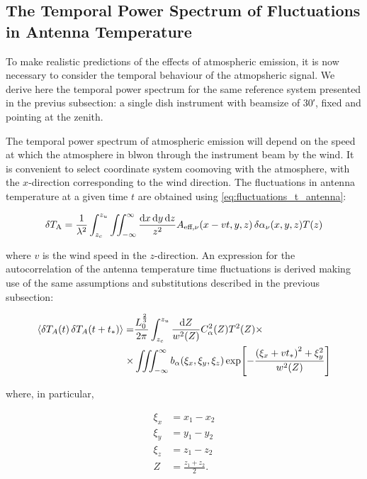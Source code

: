 \subsection{The Temporal Power Spectrum of Fluctuations in Antenna
Temperature}

To make realistic predictions of the effects of atmospheric emission, it is
now necessary to consider the temporal behaviour of the atmopsheric signal.
We derive here the temporal power spectrum for the same reference system
presented in the previus subsection: a single dish instrument with beamsize
of \ang{;30;}, fixed and
pointing at the zenith.

The temporal power spectrum of atmospheric emission will depend on the
speed at which the atmosphere in blwon through the instrument beam by the
wind. It is convenient to select coordinate system coomoving with the
atmosphere, with the $x$-direction corresponding to the wind direction. The
fluctuations in antenna temperature at a given time $t$ are obtained using
\autoref{eq:fluctuations_t_antenna}:

\begin{equation}
        \var{T_\text{A}} = \frac{1}{\lambda^2} \int^{z_u}_{z_c}
        \iint^\infty_{-\infty} \frac{\dd{x}\dd{y}\dd{z}}{z^2}
        A_{\text{eff},\nu}\qty(x - vt,y,z)
        \var{\alpha_\nu\qty(x,y,z) T\qty(z)}
\end{equation}

where $v$ is the wind speed in the $z$-direction. An expression for the
autocorrelation of the antenna temperature time fluctuations is derived
making use of the same assumptions and substitutions described in the
previous subsection:

\begin{equation}
        \begin{split}
                \expval{\var{T_A\qty(t)}\var{T_A\qty(t + t_*)}} = &
                \frac{L^{\frac{2}{3}}_0}{2\pi} \int^{z_u}_{z_c}
                \frac{\dd{Z}}{w^2\qty(Z)} C^2_\alpha\qty(Z)T^2\qty(Z) \times
                \\ \times
                & \iiint^\infty_{-\infty} b_\alpha\qty(\xi_x,\xi_y,\xi_z)
                \exp[-\frac{\qty(\xi_x + vt_*)^2 + \xi^2_y}{w^2\qty(Z)}]
        \end{split}
\end{equation}

where, in particular,

\begin{align}
         \xi_x & = x_1 - x_2 \\
         \xi_y & = y_1 - y_2 \\
         \xi_z & = z_1 - z_2 \\
         Z & = \frac{z_1 + z_2}{2}.
\end{align}

